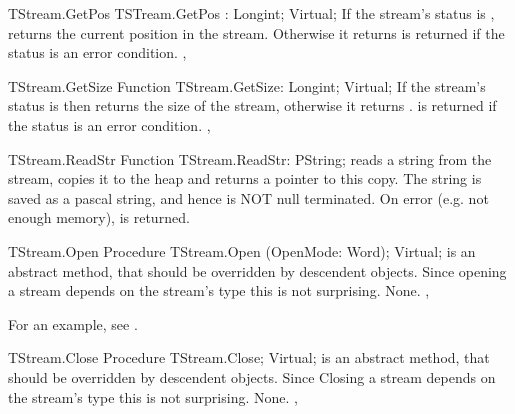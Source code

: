 

\begin{function}{TStream.GetPos}
\Declaration 
TSTream.GetPos : Longint; Virtual;
\Description
If the stream's status is ,  returns the current 
position in the stream. Otherwise it returns 
\Errors
{} is returned if the status is an error condition.
\SeeAlso
{}, 
\end{function}



\begin{function}{TStream.GetSize}
\Declaration
Function TStream.GetSize: Longint; Virtual;
\Description
If the stream's status is  then  returns
the size of the stream, otherwise it returns .
\Errors
{} is returned if the status is an error condition.
\SeeAlso
{}, 
\end{function}



\begin{function}{TStream.ReadStr}
\Declaration
Function TStream.ReadStr: PString;
\Description
{} reads a string from the stream, copies it to the heap
and returns a pointer to this copy. The string is saved as a pascal
string, and hence is NOT null terminated.
\Errors
On error (e.g. not enough memory),  is returned.
\SeeAlso
{}
\end{function}



\begin{procedure}{TStream.Open}
\Declaration
Procedure TStream.Open (OpenMode: Word); Virtual;
\Description
{} is an abstract method, that should be overridden by descendent
objects. Since opening a stream depends on the stream's type this is not
surprising.
\Errors
None.
\SeeAlso
{}, 
\end{procedure}

For an example, see .

\begin{procedure}{TStream.Close}
\Declaration
Procedure TStream.Close; Virtual;
\Description
{} is an abstract method, that should be overridden by descendent
objects. Since Closing a stream depends on the stream's type this is not
surprising.
\Errors
None.
\SeeAlso
{}, 
\end{procedure}

